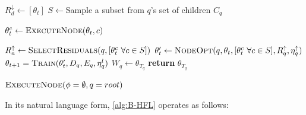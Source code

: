 \begin{algorithm}[H]
\begin{onehalfspace}
\begin{algorithmic}[1]
             \label{alg:B-HFL:line:6}
              \label{alg:B-HFL:line:8}
            \State $ R^\downarrow_d \gets [\theta_t]$ \label{alg:B-HFL:line:9}
            \EndFor
            \State $S \gets $Sample a subset from $q$'s set of children $C_q$ \label{alg:B-HFL:line:10}


             \label{alg:B-HFL:line:11}
            \State $\theta_t^c \gets \Call{ExecuteNode}{\theta_t, c} $  \label{alg:B-HFL:line:12}

            \EndFor

             \label{alg:B-HFL:line:13}
            \State $ R^\uparrow_a \gets \Call{SelectResiduals}{q,[\theta^c_t \,\, \forall c \in S]}$ \label{alg:B-HFL:line:14}
            \EndFor
            \State $\theta_t^\prime \gets \Call{NodeOpt}{q,\theta_t, [\theta^c_t \,\, \forall c \in S], R^\uparrow_q, \eta^{\uparrow}_q}  $  \label{alg:B-HFL:line:15}
            \State $\theta_{t+1} = \Call{Train}{\theta_{t}^\prime,D_q,  E_q, \eta^l_q}$  \label{alg:B-HFL:line:7}
            \EndFor
            \State $W_q \gets \theta_{T_q}$  \label{alg:B-HFL:line:16}
            \State \textbf{return} $\theta_{T_q}$ \label{alg:B-HFL:line:17}
            \EndProcedure

            \State $\Call{ExecuteNode}{\phi = \emptyset, q = root}$
        \end{algorithmic}
    \end{onehalfspace}
\end{algorithm}
\noindent In its natural language form, \cref{alg:B-HFL} operates as follows:
